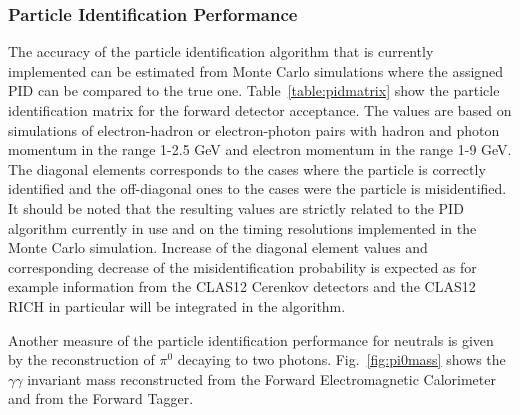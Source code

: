 \subsubsection{Particle Identification Performance}
The accuracy of the particle identification algorithm that is currently implemented can be estimated from Monte Carlo simulations where the assigned PID can be compared to the true one. Table~\ref{table:pidmatrix} show the particle identification matrix for the forward detector acceptance. The values are based on simulations of electron-hadron or electron-photon pairs with hadron and photon momentum in the range 1-2.5 GeV and electron momentum in the range 1-9 GeV. The diagonal elements corresponds to the cases where the particle is correctly identified and the off-diagonal ones to the cases were the particle is misidentified. It should be noted that the resulting values are strictly related to the PID algorithm currently in use and on the timing resolutions implemented in the Monte Carlo simulation. Increase of the diagonal element values and corresponding decrease of the misidentification probability is expected as for example information from the CLAS12 Cerenkov detectors and the CLAS12 RICH in particular will be integrated in the algorithm.

Another measure of the particle identification performance for neutrals is given by the reconstruction of $\pi^0$ decaying to two photons. Fig.~\ref{fig:pi0mass} shows the $\gamma \gamma$ invariant mass reconstructed from the Forward Electromagnetic Calorimeter and from the Forward Tagger.


